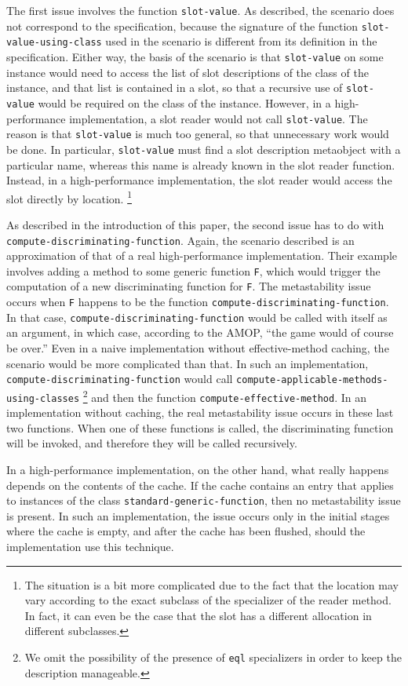 The first issue involves the function \texttt{slot-value}.  As
described, the scenario does not correspond to the specification,
because the signature of the function \texttt{slot-value-using-class}
used in the scenario is different from its definition in the
specification.  Either way, the basis of the scenario is that
\texttt{slot-value} on some instance would need to access the list of
slot descriptions of the class of the instance, and that list is
contained in a slot, so that a recursive use of \texttt{slot-value}
would be required on the class of the instance.  However, in a
high-performance implementation, a slot reader would not call
\texttt{slot-value}.  The reason is that \texttt{slot-value} is much
too general, so that unnecessary work would be done.  In particular, 
\texttt{slot-value} must find a slot description metaobject with a
particular name, whereas this name is already known in the slot
reader function.  Instead, in a high-performance implementation, the
slot reader would access the slot directly by location.%
\footnote{The situation is a bit more complicated due to the fact that
  the location may vary according to the exact subclass of the
  specializer of the reader method.  In fact, it can even be the case
  that the slot has a different allocation in different subclasses.}

As described in the introduction of this paper, the second issue has
to do with \texttt{compute-discriminating-function}.  Again, the
scenario described is an approximation of that of a real
high-performance implementation.  Their example involves adding a
method to some generic function \texttt{F}, which would trigger the
computation of a new discriminating function for \texttt{F}.  The
metastability issue occurs when \texttt{F} happens to be the function
\texttt{compute-discriminating-function}.  In that case,
\texttt{compute-discriminating-function} would be called with itself
as an argument, in which case, according to the AMOP, ``the game would
of course be over.''  Even in a naive implementation without
effective-method caching, the scenario would be more complicated than
that.  In such an implementation,
\texttt{compute-discriminating-function} would call
\texttt{compute-applicable-methods-using-classes}%
\footnote{We omit the possibility of the presence of \texttt{eql}
  specializers in order to keep the description manageable.}
and then the function \texttt{compute-effective-method}.  In an
implementation without caching, the real metastability issue occurs in
these last two functions.  When one of these functions is called, the
discriminating function will be invoked, and therefore they will be
called recursively.  

In a high-performance implementation, on the other hand, what really
happens depends on the contents of the cache.  If the cache contains
an entry that applies to instances of the class
\texttt{standard-generic-function}, then no metastability issue is
present.  In such an implementation, the issue occurs only in the
initial stages where the cache is empty, and after the cache has been
flushed, should the implementation use this technique. 


